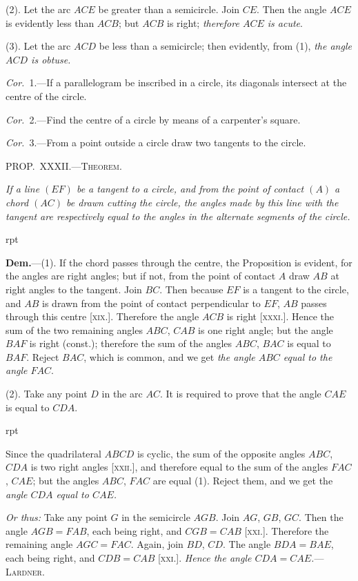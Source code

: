 \documentclass[oneside]{book}
\newcommand\mypropl[2]{
\bigskip\Needspace*{4\baselineskip}\begin{center}\textsc{#1}\end{center}
\hspace{\parindent}\emph{#2}\par\medskip
}
\newcommand\imgflow[3]{
\setcounter{wrapwidth}{#1}
\begin{wrapfigure}[#2]{r}{\value{wrapwidth}pt}
\begin{center}
\vspace{-0.3in}
\end{center}
\end{wrapfigure}
}
\begin{document}
(2). Let the arc $ACE$ be greater than a semicircle.
Join $CE$. Then the angle $ACE$ is evidently less than
$ACB$; but $ACB$ is right; \textit{therefore $ACE$ is acute}.


(3). Let the arc $ACD$ be less than a semicircle; then
evidently, from (1), \emph{the angle $ACD$ is obtuse.}

\emph{Cor.}~1.---If a parallelogram be inscribed in a circle,
its diagonals intersect at the centre of the circle.

\emph{Cor.}~2.---Find the centre of a circle by means of a
carpenter's square.

\emph{Cor.}~3.---From a point outside a circle draw two
tangents to the circle.

\mypropl{PROP\@.~XXXII\@.---Theorem.}{If a line $(EF)$ be a tangent to a circle, and from the
point of contact $(A)$ a chord $(AC)$ be drawn cutting the
circle, the angles made by this line with the tangent are
respectively equal to the angles in the alternate segments
of the circle.}

\imgflow{143}{11}{f138}

\textbf{Dem.}---(1). If the chord passes through the centre,
the Proposition is evident,
for the angles are right
angles; but if not, from the
point of contact $A$ draw $AB$
at right angles to the tangent.
Join $BC$. Then because $EF$
is a tangent to the circle,
and $AB$ is drawn from the
point of contact perpendicular
to $EF$, $AB$ passes through
this centre [\textsc{xix.}]. Therefore
the angle $ACB$ is right [\textsc{xxxi.}]. Hence the sum of the
two remaining angles $ABC$, $CAB$ is one right angle;
but the angle $BAF$ is right (const.); therefore the sum
of the angles $ABC$, $BAC$ is equal to $BAF$. Reject
$BAC$, which is common, and we get \emph{the angle $ABC$
equal to the angle $FAC$}.

(2). Take any point $D$ in the arc $AC$. It is required
to prove that the angle $CAE$ is equal to $CDA$.

\imgflow{130}{12}{f139}

Since the quadrilateral $ABCD$ is cyclic, the sum of
the opposite angles $ABC$, $CDA$ is two right angles
[\textsc{xxii.}], and therefore equal to the sum of the angles
$FAC$, $CAE$; but the angles $ABC$, $FAC$ are equal (1).
Reject them, and we get the \emph{angle $CDA$ equal to
$CAE$.}

\emph{Or thus:} Take any point
$G$ in the semicircle $AGB$.
Join $AG$, $GB$, $GC$. Then the
angle $AGB = FAB$, each being
right, and $CGB = CAB$ [\textsc{xxi.}].
Therefore the remaining angle
$AGC = FAC$. Again, join $BD$,
$CD$. The angle $BDA = BAE$,
each being right, and $CDB
= CAB$ [\textsc{xxi.}]. \emph{Hence the angle
$CDA = CAE$.}---\textsc{Lardner}.
\end{document}
